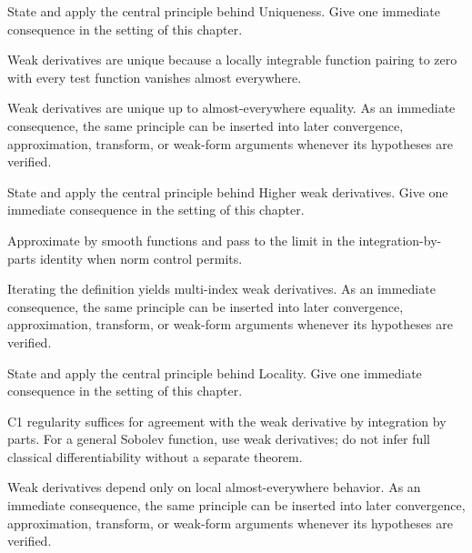 \begin{exercise}\label{exr:iii20-04}
State and apply the central principle behind Uniqueness. Give one immediate consequence in the setting of this chapter.
\end{exercise}
\begin{hint}
Weak derivatives are unique because a locally integrable function pairing to zero with every test function vanishes almost everywhere.
\end{hint}
\begin{solution}
Weak derivatives are unique up to almost-everywhere equality. As an immediate consequence, the same principle can be inserted into later convergence, approximation, transform, or weak-form arguments whenever its hypotheses are verified.
\end{solution}

\begin{exercise}\label{exr:iii20-05}
State and apply the central principle behind Higher weak derivatives. Give one immediate consequence in the setting of this chapter.
\end{exercise}
\begin{hint}
Approximate by smooth functions and pass to the limit in the integration-by-parts identity when norm control permits.
\end{hint}
\begin{solution}
Iterating the definition yields multi-index weak derivatives. As an immediate consequence, the same principle can be inserted into later convergence, approximation, transform, or weak-form arguments whenever its hypotheses are verified.
\end{solution}

\begin{exercise}\label{exr:iii20-06}
State and apply the central principle behind Locality. Give one immediate consequence in the setting of this chapter.
\end{exercise}
\begin{hint}
C1 regularity suffices for agreement with the weak derivative by integration by parts. For a general Sobolev function, use weak derivatives; do not infer full classical differentiability without a separate theorem.
\end{hint}
\begin{solution}
Weak derivatives depend only on local almost-everywhere behavior. As an immediate consequence, the same principle can be inserted into later convergence, approximation, transform, or weak-form arguments whenever its hypotheses are verified.
\end{solution}

